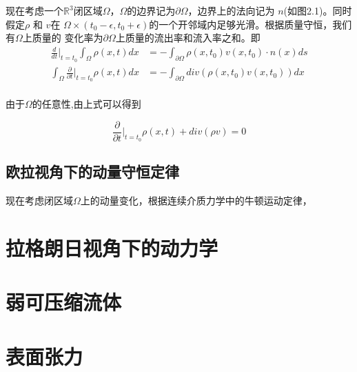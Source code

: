 现在考虑一个$\mathbb{R}^3$闭区域$\Omega$，$\Omega$的边界记为$\partial \Omega$，边界上的法向记为
$n$(如图2.1)。同时假定$\rho$ 和 $v$在 $\Omega \times (t_0 - \epsilon, t_0 + \epsilon)$的一个开邻域内足够光滑。根据质量守恒，我们有$\Omega$上质量的
变化率为$\partial \Omega$上质量的流出率和流入率之和。即
\begin{equation}
    \begin{split}
        \frac{d}{dt} \Big |_{t = t_0}\int_{\Omega} \rho(x,t)dx &= -\int_{\partial \Omega} \rho(x,t_0) v(x,t_0) \cdot n(x) ds \\
        \int_{\Omega} \frac{\partial}{\partial t}\Big |_{t = t_0} \rho (x,t)dx &= -\int_{\partial \Omega} div(\rho(x,t_0) v(x,t_0))dx\nonumber\\
    \end{split}
\end{equation}

由于$\Omega$的任意性,由上式可以得到

\begin{equation}
    \frac{\partial}{\partial t}\Big |_{t = t_0}\rho(x,t) + div(\rho v) = 0
\end{equation}

\subsection{欧拉视角下的动量守恒定律}
现在考虑闭区域$\Omega$上的动量变化，根据连续介质力学中的牛顿运动定律，




\section{拉格朗日视角下的动力学}
\section{弱可压缩流体}
\section{表面张力}

